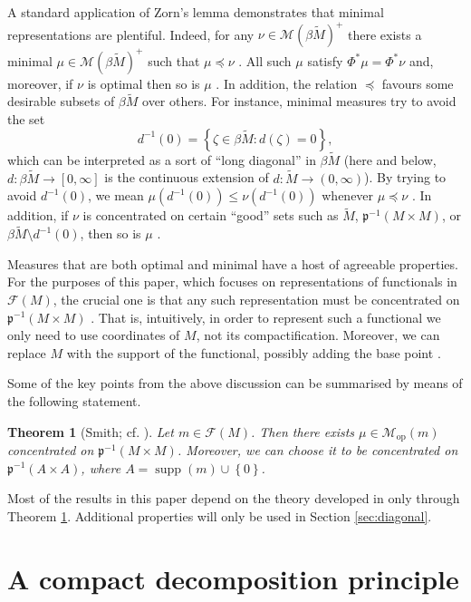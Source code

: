 \documentclass[a4paper,10pt]{amsart}
\DeclareMathOperator{\supp}{supp}                           %
\newcommand{\set}[1]{\left\{{#1}\right\}}                   %
\newcommand{\lipfree}[1]{\mathcal{F}({#1})}                 %
\newcommand{\meas}[1]{\mathcal{M}({#1})}                    %
\newcommand{\wt}[1]{\widetilde{#1}}                         %
\newcommand{\bwt}[1]{\beta\wt{#1}}                          %
\newcommand{\pp}{\mathfrak{p}}                              %
\newcommand{\opr}[1]{\mathcal{M}_{\mathrm{op}}(#1)}         %
\renewcommand{\leq}{\leqslant}
\theoremstyle{plain}
\newtheorem{theorem}{Theorem}[section]
\theoremstyle{definition}
\theoremstyle{remark}
\begin{document}
A standard application of Zorn's lemma demonstrates that minimal representations are plentiful. Indeed, for any $\nu \in \meas{\bwt{M}}^+$ there exists a minimal $\mu \in \meas{\bwt{M}}^+$ such that $\mu \preccurlyeq \nu$ \cite[Proposition 3.10]{Smith24}. All such $\mu$ satisfy $\Phi^*\mu = \Phi^* \nu$ and, moreover, if $\nu$ is optimal then so is $\mu$ \cite[Proposition 3.6]{Smith24}. In addition, the relation $\preccurlyeq$ favours some desirable subsets of $\bwt{M}$ over others. For instance, minimal measures try to avoid the set
$$
d^{-1}(0)=\set{\zeta\in\bwt{M} : d(\zeta)=0} ,
$$
which can be interpreted as a sort of ``long diagonal'' in $\bwt{M}$ (here and below, $d:\bwt{M}\to [0,\infty]$ is the continuous extension of $d:\wt{M}\to (0,\infty)$). By trying to avoid $d^{-1}(0)$, we mean $\mu(d^{-1}(0))\leq\nu(d^{-1}(0))$ whenever $\mu\preccurlyeq\nu$ \cite[Proposition 3.18]{Smith24}. In addition, if $\nu$ is concentrated on certain ``good'' sets such as $\wt{M}$, $\pp^{-1}(M\times M)$, or $\bwt{M}\setminus d^{-1}(0)$, then so is $\mu$ \cite[Proposition 3.18 and Corollary 3.27]{Smith24}.

Measures that are both optimal and minimal have a host of agreeable properties. For the purposes of this paper, which focuses on representations of functionals in $\lipfree{M}$, the crucial one is that any such representation must be concentrated on $\pp^{-1}(M\times M)$ \cite[Theorem 5.2]{Smith24}. That is, intuitively, in order to represent such a functional we only need to use coordinates of $M$, not its compactification. Moreover, we can replace $M$ with the support of the functional, possibly adding the base point \cite[Corollary 5.6]{Smith24}.

Some of the key points from the above discussion can be summarised by means of the following statement.

\begin{theorem}[Smith; cf. {\cite[Corollary 5.6]{Smith24}}]\label{th:opt_conc}
Let $m \in \lipfree{M}$. Then there exists $\mu \in \opr{m}$ concentrated on $\pp^{-1}(M\times M)$. Moreover, we can choose it to be concentrated on $\pp^{-1}(A\times A)$, where $A=\supp(m)\cup\set{0}$.
\end{theorem}

Most of the results in this paper depend on the theory developed in \cite{Smith24} only through Theorem \ref{th:opt_conc}. Additional properties will only be used in Section \ref{sec:diagonal}.



\section{A compact decomposition principle}
\end{document}
